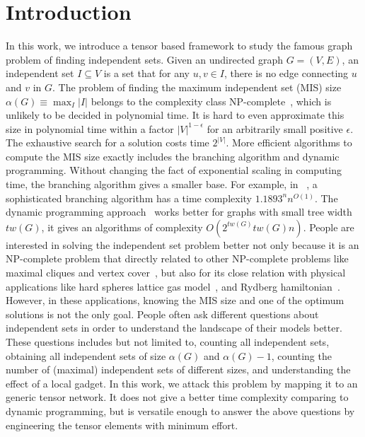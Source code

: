 \documentclass[review,onefignum,onetabnum]{siamart190516}
\newcommand{\<}{\langle}
\renewcommand{\>}{\rangle}
\newcounter{example}
\begin{document}
\section{Introduction}
In this work, we introduce a tensor based framework to study the famous graph problem of finding independent sets.
Given an undirected graph $G = (V,E)$, an independent set $I \subseteq V$ is a set that for any $u,v \in I$, there is no edge connecting $u$ and $v$ in $G$.
The problem of finding the maximum independent set (MIS) size $\alpha(G) \equiv \max_{I}|I|$ belongs to the complexity class NP-complete~\cite{Hastad1996}, which is unlikely to be decided in polynomial time.
It is hard to even approximate this size in polynomial time within a factor $|V|^{1-\epsilon}$ for an arbitrarily small positive $\epsilon$.
The exhaustive search for a solution costs time $2^{|V|}$.
More efficient algorithms to compute the MIS size exactly includes the branching algorithm and dynamic programming.
Without changing the fact of exponential scaling in computing time, the branching algorithm gives a smaller base.
For example, in ~\cite{Xiao2017}, a sophisticated branching algorithm has a time complexity $1.1893^n n ^{O(1)}$.
The dynamic programming approach~\cite{Courcelle1990,Fomin2013} works better for graphs with small tree width $tw(G)$, it gives an algorithms of complexity $O(2^{tw(G)}tw(G)n)$.
People are interested in solving the independent set problem better not only because it is an NP-complete problem that directly related to other NP-complete problems like maximal cliques and vertex cover~\cite{Moore2011},
but also for its close relation with physical applications like hard spheres lattice gas model~\cite{Dyre2016}, and Rydberg hamiltonian~\cite{Pichler2018}.
However, in these applications, knowing the MIS size and one of the optimum solutions is not the only goal.
People often ask different questions about independent sets in order to understand the landscape of their models better.
These questions includes but not limited to, counting all independent sets, obtaining all independent sets of size $\alpha(G)$ and $\alpha(G)-1$,
counting the number of (maximal) independent sets of different sizes, and understanding the effect of a local gadget.
In this work, we attack this problem by mapping it to an generic tensor network.
It does not give a better time complexity comparing to dynamic programming, but is versatile enough to answer the above questions by engineering the tensor elements with minimum effort.
\end{document}
